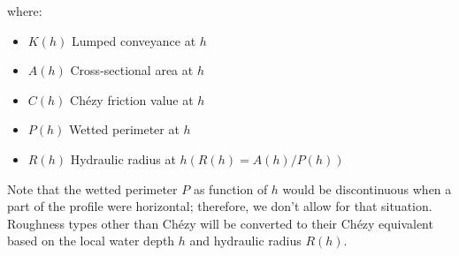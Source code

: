 where:
\begin{itemize}
\item $K(h)$ Lumped conveyance at $h$
\item $A(h)$ Cross-sectional area at $h$
\item $C(h)$ Ch\'ezy friction value at $h$
\item $P(h)$ Wetted perimeter at $h$
\item $R(h)$ Hydraulic radius at $h(R(h)=A(h)/P(h))$
\end{itemize}

Note that the wetted perimeter $P$ as function of $h$ would be discontinuous when a part of the profile were horizontal; therefore, we don't allow for that situation.
Roughness types other than Ch\'ezy will be converted to their Ch\'ezy equivalent based on the local water depth $h$ and hydraulic radius $R(h)$.

\printrefsegment

